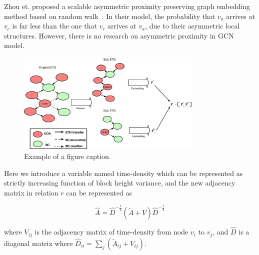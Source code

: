  Zhou et. proposed a scalable asymmetric proximity preserving graph embedding method based on random walk~\cite{zhou2017scalable}. In their model, the probability that $v_a$ arrives at $v_c$ is far less than the one that $v_c$ arrives at $v_a$, due to their asymmetric local structures. However, there is no research on asymmetric proximity in GCN model.
 



\begin{figure}[htbp]
	\centering
	\label{fig_graph_split}
	\includegraphics[width=3.5in]{fig/graph_split.eps}
	\caption{Example of a figure caption.}
\end{figure}





Here we introduce a variable named time-density which can be represented as strictly increasing function of block height variance, and the new adjacency matrix in relation $r$ can be represented as 

\begin{equation}
\hat{A}=\hat{D}^{-\frac{1}{2}}(\tilde{A}+V)\hat{D}^{-\frac{1}{2}}
\label{eq:?}
\end{equation}

where $V_{ij}$ is the adjacency matrix of time-density from node $v_i$ to $v_j$, and $\hat{D}$ is a diagonal matrix where $\hat{D}_{ii}=\sum_{j}(\tilde{A}_{ij}+V_{ij})$.



